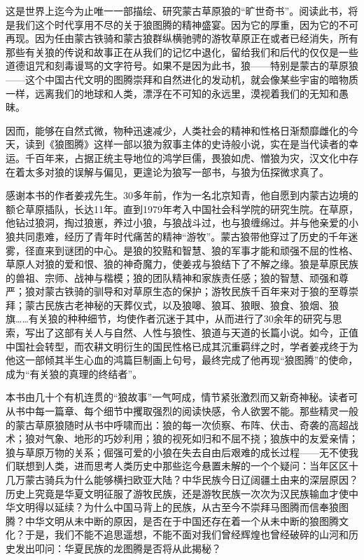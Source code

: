 \par 这是世界上迄今为止唯一一部描绘、研究蒙古草原狼的“旷世奇书”。阅读此书，将是我们这个时代享用不尽的关于狼图腾的精神盛宴。因为它的厚重，因为它的不可再现。因为任由蒙古铁骑和蒙古狼群纵横驰骋的游牧草原正在或者已经消失，所有那些有关狼的传说和故事正在从我们的记忆中退化，留给我们和后代的仅仅是一些道德诅咒和刻毒谩骂的文字符号。如果不是因为此书，狼——特别是蒙古的草原狼——这个中国古代文明的图腾崇拜和自然进化的发动机，就会像某些宇宙的暗物质一样，远离我们的地球和人类，漂浮在不可知的永远里，漠视着我们的无知和愚昧。
\par 因而，能够在自然式微，物种迅速减少，人类社会的精神和性格日渐颓靡雌化的今天，读到《狼图腾》这样一部以狼为叙事主体的史诗般小说，实在是当代读者的幸运。千百年来，占据正统主导地位的鸿学巨儒，畏狼如虎、憎狼为灾，汉文化中存在着太多对狼的误解与偏见，更遑论为狼写一部书，与狼为伍探微求真了。
\par 感谢本书的作者姜戎先生。30多年前，作为一名北京知青，他自愿到内蒙古边境的额仑草原插队，长达11年。直到1979年考入中国社会科学院的研究生院。在草原，他钻过狼洞，掏过狼崽，养过小狼，与狼战斗过，也与狼缠绵过。并与他亲爱的小狼共同患难，经历了青年时代痛苦的精神“游牧”。蒙古狼带他穿过了历史的千年迷雾，径直来到谜团的中心。是狼的狡黠和智慧、狼的军事才能和顽强不屈的性格、草原人对狼的爱和恨、狼的神奇魔力，使姜戎与狼结下了不解之缘。狼是草原民族的兽祖、宗师、战神与楷模；狼的团队精神和家族责任感；狼的智慧、顽强和尊严；狼对蒙古铁骑的驯导和对草原生态的保护；游牧民族千百年来对于狼的至尊崇拜；蒙古民族古老神秘的天葬仪式，以及狼嗥、狼耳、狼眼、狼食、狼烟、狼旗……有关狼的种种细节，均使作者沉迷于其中，从而进行了30余年的研究与思索，写出了这部有关人与自然、人性与狼性、狼道与天道的长篇小说。如今，正值中国社会转型，而农耕文明衍生的国民性格已成其沉重羁绊之时，学者姜戎终于为他这一部倾其半生心血的鸿篇巨制画上句号，最终完成了他再现“狼图腾”的使命，成为“有关狼的真理的终结者”。
\par 本书由几十个有机连贯的“狼故事”一气呵成，情节紧张激烈而又新奇神秘。读者可从书中每一篇章、每个细节中攫取强烈的阅读快感，令人欲罢不能。那些精灵一般的蒙古草原狼随时从书中呼啸而出：狼的每一次侦察、布阵、伏击、奇袭的高超战术；狼对气象、地形的巧妙利用；狼的视死如归和不屈不挠；狼族中的友爱亲情；狼与草原万物的关系；倔强可爱的小狼在失去自由后艰难的成长过程——无不使我们联想到人类，进而思考人类历史中那些迄今悬置未解的一个个疑问：当年区区十几万蒙古骑兵为什么能够横扫欧亚大陆？中华民族今日辽阔疆土由来的深层原因？历史上究竟是华夏文明征服了游牧民族，还是游牧民族一次次为汉民族输血才使中华文明得以延续？为什么中国马背上的民族，从古至今不崇拜马图腾而信奉狼图腾？中华文明从未中断的原因，是否在于中国还存在着一个从未中断的狼图腾文化？于是，我们不能不追思遥想，不能不面对我们曾经辉煌也曾经破碎的山河和历史发出叩问：华夏民族的龙图腾是否将从此揭秘？
\par {}
\par {}



